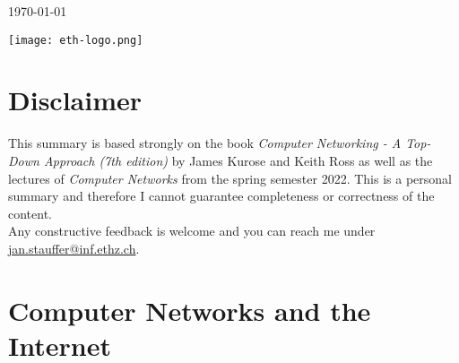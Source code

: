 \begin{titlepage}
	{\large \today} %
	
	
	\vfill\vfill
	\texttt{[image: eth-logo.png]}\\[1cm] %
	 
	
	\vfill %
	
\end{titlepage}


\section*{Disclaimer}
This summary is based strongly on the book \textit{Computer Networking - A Top-Down Approach (7th edition)} by James Kurose and Keith Ross as well as the 
lectures of \textit{Computer Networks} from the spring semester 2022. This is a personal summary and therefore I cannot guarantee completeness or correctness of the content.\\
Any constructive feedback is welcome and you can reach me under \href{mailto:jan.stauffer@inf.ethz.ch}{jan.stauffer@inf.ethz.ch}.
\newpage

\tableofcontents
\newpage

\section{Computer Networks and the Internet}
